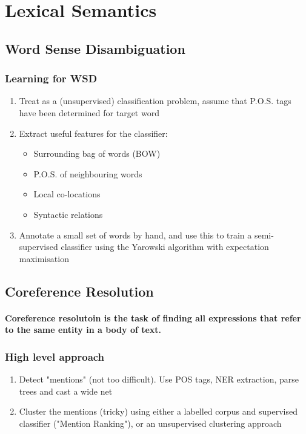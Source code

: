 \documentclass[]{article}
\begin{document}
\section{Lexical Semantics}

\subsection{Word Sense Disambiguation}
\subsubsection{Learning for WSD}
\begin{enumerate}
	\item Treat as a (unsupervised) classification problem, assume that P.O.S. tags have been determined for target word
	\item Extract useful features for the classifier:
	\begin{itemize}
		\item Surrounding bag of words (BOW)
		\item P.O.S. of neighbouring words
		\item Local co-locations
		\item Syntactic relations
	\end{itemize}
	\item Annotate a small set of words by hand, and use this to train a semi-supervised classifier using the Yarowski algorithm with expectation maximisation
\end{enumerate}

\subsection{Coreference Resolution}
\paragraph{Coreference resolutoin is the task of finding all expressions that refer to the same entity in a body of text.}
\subsubsection{High level approach}
\begin{enumerate}
	\item Detect "mentions" (not too difficult). Use POS tags, NER extraction, parse trees and cast a wide net
	\item Cluster the mentions (tricky) using either a labelled corpus and supervised classifier ("Mention Ranking"), or an unsupervised clustering approach
\end{enumerate}
\end{document}
